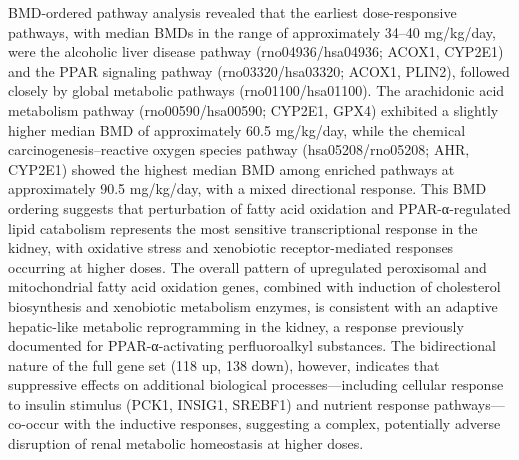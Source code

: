 BMD-ordered pathway analysis revealed that the earliest dose-responsive pathways, with median BMDs in the range of approximately 34–40 mg/kg/day, were the alcoholic liver disease pathway (rno04936/hsa04936; ACOX1, CYP2E1) and the PPAR signaling pathway (rno03320/hsa03320; ACOX1, PLIN2), followed closely by global metabolic pathways (rno01100/hsa01100). The arachidonic acid metabolism pathway (rno00590/hsa00590; CYP2E1, GPX4) exhibited a slightly higher median BMD of approximately 60.5 mg/kg/day, while the chemical carcinogenesis–reactive oxygen species pathway (hsa05208/rno05208; AHR, CYP2E1) showed the highest median BMD among enriched pathways at approximately 90.5 mg/kg/day, with a mixed directional response. This BMD ordering suggests that perturbation of fatty acid oxidation and PPAR-α-regulated lipid catabolism represents the most sensitive transcriptional response in the kidney, with oxidative stress and xenobiotic receptor-mediated responses occurring at higher doses. The overall pattern of upregulated peroxisomal and mitochondrial fatty acid oxidation genes, combined with induction of cholesterol biosynthesis and xenobiotic metabolism enzymes, is consistent with an adaptive hepatic-like metabolic reprogramming in the kidney, a response previously documented for PPAR-α-activating perfluoroalkyl substances. The bidirectional nature of the full gene set (118 up, 138 down), however, indicates that suppressive effects on additional biological processes—including cellular response to insulin stimulus (PCK1, INSIG1, SREBF1) and nutrient response pathways—co-occur with the inductive responses, suggesting a complex, potentially adverse disruption of renal metabolic homeostasis at higher doses.

